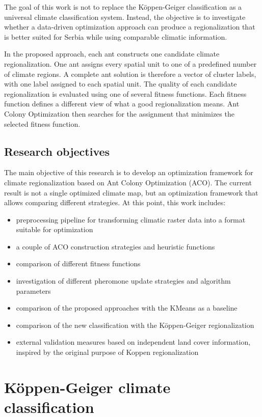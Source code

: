 \documentclass[11pt]{article}
\begin{document}
The goal of this work is not to replace the Köppen-Geiger classification as a universal climate classification system. Instead, the objective is to investigate whether a data-driven optimization approach can produce a regionalization that is better suited for Serbia while using comparable climatic information.

In the proposed approach, each ant constructs one candidate climate regionalization. One ant assigns every spatial unit to one of a predefined number of climate regions. A complete ant solution is therefore a vector of cluster labels, with one label assigned to each spatial unit. The quality of each candidate regionalization is evaluated using one of several fitness functions. Each fitness function defines a different view of what a good regionalization means. Ant Colony Optimization then searches for the assignment that minimizes the selected fitness function.


\subsection{Research objectives}
The main objective of this research is to develop an optimization framework for climate regionalization based on Ant Colony Optimization (ACO).
The current result is not a single optimized climate map, but an optimization framework that allows comparing different strategies. At this point, this work includes:

\begin{itemize}
    \item preprocessing pipeline for transforming climatic raster data into a format suitable for optimization
    \item a couple of ACO construction strategies and heuristic functions
    \item comparison of different fitness functions
    \item investigation of different pheromone update strategies and algorithm parameters
    \item comparison of the proposed approaches with the KMeans as a baseline
    \item comparison of the new classification with the Köppen-Geiger regionalization
    \item external validation measures based on independent land cover information, inspired by the original purpose of Koppen regionalization
\end{itemize}


\section{Köppen-Geiger climate classification}
\label{sec:koppen}
\end{document}
